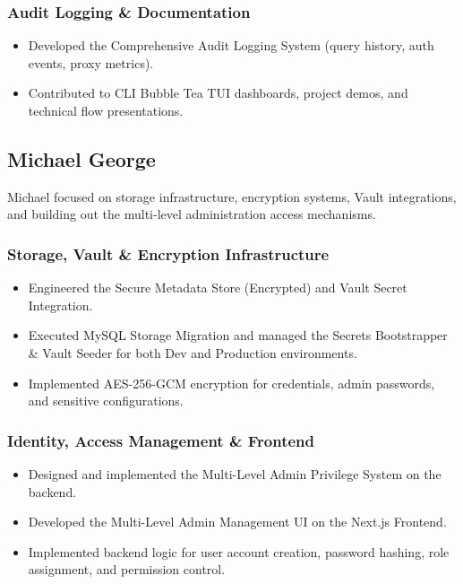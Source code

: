 \subsubsection{Audit Logging \& Documentation}
\begin{itemize}
    \item Developed the Comprehensive Audit Logging System (query history, auth events, proxy metrics).
    \item Contributed to CLI Bubble Tea TUI dashboards, project demos, and technical flow presentations.
\end{itemize}


\subsection{Michael George}

Michael focused on storage infrastructure, encryption systems, Vault integrations, and building out the multi-level administration access mechanisms.

\subsubsection{Storage, Vault \& Encryption Infrastructure}
\begin{itemize}
    \item Engineered the Secure Metadata Store (Encrypted) and Vault Secret Integration.
    \item Executed MySQL Storage Migration and managed the Secrets Bootstrapper \& Vault Seeder for both Dev and Production environments.
    \item Implemented AES-256-GCM encryption for credentials, admin passwords, and sensitive configurations.
\end{itemize}

\subsubsection{Identity, Access Management \& Frontend}
\begin{itemize}
    \item Designed and implemented the Multi-Level Admin Privilege System on the backend.
    \item Developed the Multi-Level Admin Management UI on the Next.js Frontend.
    \item Implemented backend logic for user account creation, password hashing, role assignment, and permission control.
\end{itemize}

